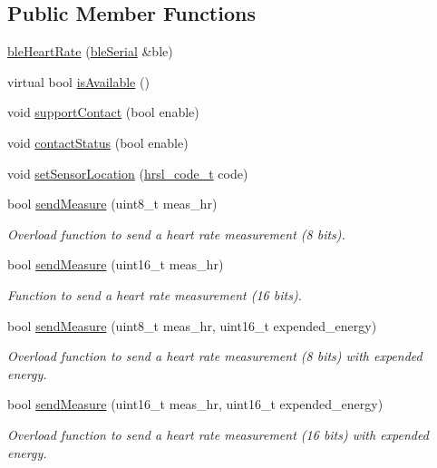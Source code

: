 \subsection*{Public Member Functions}
\begin{DoxyCompactItemize}
\item 
\hyperlink{classble_heart_rate_af5e0bc81b5d2f8e290b6cba8050f80c2}{ble\-Heart\-Rate} (\hyperlink{classble_serial}{ble\-Serial} \&ble)
\item 
virtual bool \hyperlink{classble_heart_rate_a822019806bf50f6d25ae075b62a838ab}{is\-Available} ()
\item 
void \hyperlink{classble_heart_rate_acd5a0148a2df6692893a274a18710431}{support\-Contact} (bool enable)
\item 
void \hyperlink{classble_heart_rate_a4b05ceb33ffe7fcfe9f1a3dbf9679882}{contact\-Status} (bool enable)
\item 
void \hyperlink{classble_heart_rate_a9c822ea4fafcb609e009427feb0949c2}{set\-Sensor\-Location} (\hyperlink{group___enumerations_ga142ef314a313f7071c544be2939c13a3}{hrsl\-\_\-code\-\_\-t} code)
\item 
bool \hyperlink{classble_heart_rate_a2b7329b1756f03c99334b6575e14c090}{send\-Measure} (uint8\-\_\-t meas\-\_\-hr)
\begin{DoxyCompactList}\small\item\em Overload function to send a heart rate measurement (8 bits). \end{DoxyCompactList}\item 
bool \hyperlink{classble_heart_rate_a9f69ad22553dabc5b992bf9a15aa6667}{send\-Measure} (uint16\-\_\-t meas\-\_\-hr)
\begin{DoxyCompactList}\small\item\em Function to send a heart rate measurement (16 bits). \end{DoxyCompactList}\item 
bool \hyperlink{classble_heart_rate_ac0bd83937f2997c2451918a421c277c2}{send\-Measure} (uint8\-\_\-t meas\-\_\-hr, uint16\-\_\-t expended\-\_\-energy)
\begin{DoxyCompactList}\small\item\em Overload function to send a heart rate measurement (8 bits) with expended energy. \end{DoxyCompactList}\item 
bool \hyperlink{classble_heart_rate_a34a055d4b926b2447ca78a4f63691d30}{send\-Measure} (uint16\-\_\-t meas\-\_\-hr, uint16\-\_\-t expended\-\_\-energy)
\begin{DoxyCompactList}\small\item\em Overload function to send a heart rate measurement (16 bits) with expended energy. \end{DoxyCompactList}\item 

\end{DoxyCompactItemize}
